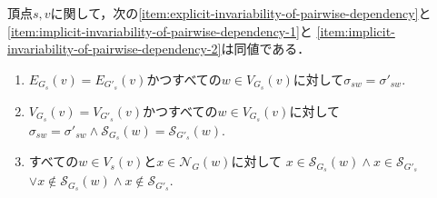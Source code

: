 \begin{lemma}
  \label{lemma:transformation-of-invariability-of-pairwise-dependency}
  頂点$s,v$に関して，次の\ref{item:explicit-invariability-of-pairwise-dependency}と
  \ref{item:implicit-invariability-of-pairwise-dependency-1}と
  \ref{item:implicit-invariability-of-pairwise-dependency-2}は同値である．
  \begin{enumerate}[label=(\alph*)]
  \item $E_{G_s}(v)=E_{G'_s}(v)$かつすべての$w\in V_{G_s}(v)$に対して$\sigma_{sw}=\sigma'_{sw}$.
    \label{item:explicit-invariability-of-pairwise-dependency}
  \item $V_{G_s}(v)=V_{G'_s}(v)$かつすべての$w\in V_{G_s}(v)$に対して
    $\sigma_{sw}=\sigma'_{sw}\land\mathcal{S}_{G_s}(w)=\mathcal{S}_{G'_s}(w)$.
    \label{item:implicit-invariability-of-pairwise-dependency-1}
  \item すべての$w\in V_s(v)$と$x\in\mathcal{N}_G(w)$に対して
    $x\in\mathcal{S}_{G_s}(w)\land x\in\mathcal{S}_{G'_s}$
    $\lor x\notin\mathcal{S}_{G_s}(w)\land x\notin\mathcal{S}_{G'_s}$.
    \label{item:implicit-invariability-of-pairwise-dependency-2}
  \end{enumerate}
\end{lemma}
